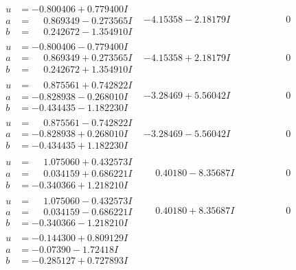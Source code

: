\documentclass[1p]{elsarticle_modified}
\theoremstyle{definition}
\begin{document}
$$\begin{array}{c|c|c}
\begin{aligned}
u &= -0.800406 + 0.779400 I \\
a &= \phantom{-}0.869349 - 0.273565 I \\
b &= \phantom{-}0.242672 - 1.354910 I\end{aligned}
 & -4.15358 - 2.18179 I & \phantom{-0.000000 } 0 \\ \hline\begin{aligned}
u &= -0.800406 - 0.779400 I \\
a &= \phantom{-}0.869349 + 0.273565 I \\
b &= \phantom{-}0.242672 + 1.354910 I\end{aligned}
 & -4.15358 + 2.18179 I & \phantom{-0.000000 } 0 \\ \hline\begin{aligned}
u &= \phantom{-}0.875561 + 0.742822 I \\
a &= -0.828938 - 0.268010 I \\
b &= -0.434435 - 1.182230 I\end{aligned}
 & -3.28469 + 5.56042 I & \phantom{-0.000000 } 0 \\ \hline\begin{aligned}
u &= \phantom{-}0.875561 - 0.742822 I \\
a &= -0.828938 + 0.268010 I \\
b &= -0.434435 + 1.182230 I\end{aligned}
 & -3.28469 - 5.56042 I & \phantom{-0.000000 } 0 \\ \hline\begin{aligned}
u &= \phantom{-}1.075060 + 0.432573 I \\
a &= \phantom{-}0.034159 + 0.686221 I \\
b &= -0.340366 + 1.218210 I\end{aligned}
 & \phantom{-}0.40180 - 8.35687 I & \phantom{-0.000000 } 0 \\ \hline\begin{aligned}
u &= \phantom{-}1.075060 - 0.432573 I \\
a &= \phantom{-}0.034159 - 0.686221 I \\
b &= -0.340366 - 1.218210 I\end{aligned}
 & \phantom{-}0.40180 + 8.35687 I & \phantom{-0.000000 } 0 \\ \hline\begin{aligned}
u &= -0.144300 + 0.809129 I \\
a &= -0.07390 - 1.72418 I \\
b &= -0.285127 + 0.727893 I\end{aligned}

\end{array}$$
\end{document}

